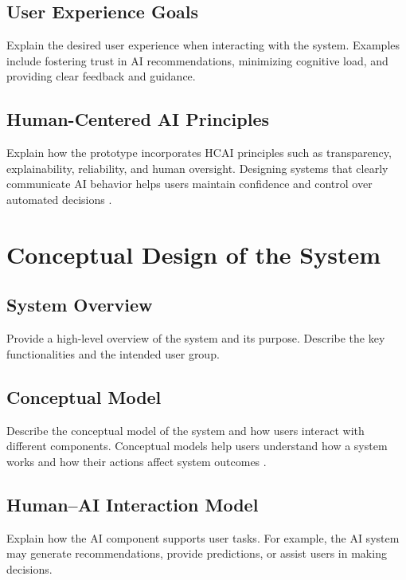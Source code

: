 \documentclass[sigconf]{acmart}
\begin{document}
\subsection{User Experience Goals}

Explain the desired user experience when interacting with the system. Examples include fostering trust in AI recommendations, minimizing cognitive load, and providing clear feedback and guidance.

\subsection{Human-Centered AI Principles}

Explain how the prototype incorporates HCAI principles such as transparency, explainability, reliability, and human oversight. Designing systems that clearly communicate AI behavior helps users maintain confidence and control over automated decisions \cite{amershi2019guidelines}.

\section{Conceptual Design of the System}

\subsection{System Overview}

Provide a high-level overview of the system and its purpose. Describe the key functionalities and the intended user group.

\subsection{Conceptual Model}

Describe the conceptual model of the system and how users interact with different components. Conceptual models help users understand how a system works and how their actions affect system outcomes \cite{preece2015interaction}.

\subsection{Human--AI Interaction Model}

Explain how the AI component supports user tasks. For example, the AI system may generate recommendations, provide predictions, or assist users in making decisions.
\end{document}
